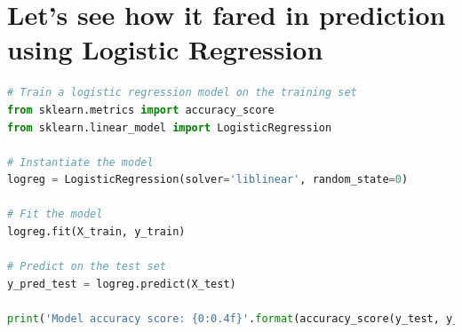 \documentclass{article}
\begin{document}
\section{Let’s see how it fared in prediction using Logistic Regression}
\begin{center}
\begin{lstlisting}[language=Python, caption={Logistic Regression Example}, label={lst:logreg}, backgroundcolor=\color{gray!10}, frame=single, keywordstyle=\color{blue}\bfseries, commentstyle=\color{green!50!black}, stringstyle=\color{orange}]
# Train a logistic regression model on the training set
from sklearn.metrics import accuracy_score
from sklearn.linear_model import LogisticRegression

# Instantiate the model
logreg = LogisticRegression(solver='liblinear', random_state=0)

# Fit the model
logreg.fit(X_train, y_train)

# Predict on the test set
y_pred_test = logreg.predict(X_test)

print('Model accuracy score: {0:0.4f}'.format(accuracy_score(y_test, y_pred_test)))
\end{lstlisting}
\end{center}
\end{document}
